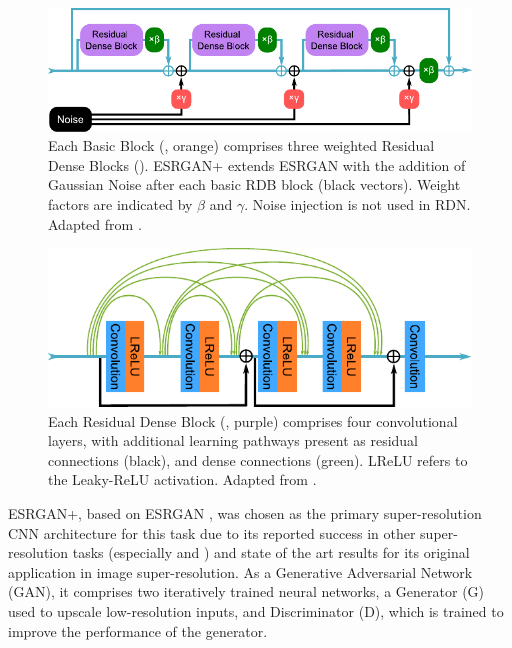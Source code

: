 \begin{figure}[hbtp]
    \centering
    \includegraphics[width=\linewidth]{fig/p1/rdb_vec.pdf}
    \caption[Basic blocks]{Each Basic Block (, orange) comprises three weighted Residual Dense Blocks ().
        ESRGAN+ extends ESRGAN with the addition of Gaussian Noise after each basic RDB block (black vectors).
        Weight factors are indicated by \(\beta{}\) and \(\gamma{}\).
        Noise injection is not used in RDN\@.
        Adapted from \textcite{rakotonirinaESRGANFurtherImproving2020}.
    }
    \label{fig:rdb}
\end{figure}

\begin{figure}[hbtp]
    \centering
    \includegraphics[width=0.75\linewidth]{fig/p1/convs_vec.pdf}
    \caption[RDB convolutional layers]{Each Residual Dense Block (, purple) comprises four convolutional layers, with additional learning pathways present as residual connections (black), and dense connections (green). LReLU refers to the Leaky-ReLU activation. Adapted from \textcite{rakotonirinaESRGANFurtherImproving2020}.}
    \label{fig:convs}
\end{figure}


ESRGAN+, based on ESRGAN \parencite{wangESRGANEnhancedSuperresolution2018}, was chosen as the primary super-resolution CNN architecture for this task due to its reported success in other super-resolution tasks (especially \textcite{bodeUsingPhysicsInformedSuperResolution2019} and \textcite{leongDeepBedMapDeepNeural2020}) and state of the art results for its original application in image super-resolution.
As a Generative Adversarial Network (GAN), it comprises two iteratively trained neural networks, a Generator (G) used to upscale low-resolution inputs, and Discriminator (D), which is trained to improve the performance of the generator.

